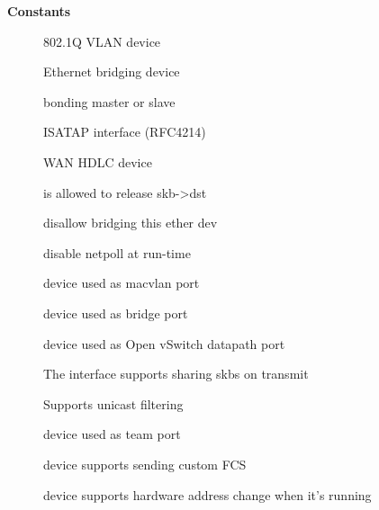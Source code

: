 \documentclass[a4paper,8pt,english]{sphinxmanual}
\begin{document}
\textbf{Constants}
\begin{description}
\item[{}] \leavevmode
802.1Q VLAN device

\item[{}] \leavevmode
Ethernet bridging device

\item[{}] \leavevmode
bonding master or slave

\item[{}] \leavevmode
ISATAP interface (RFC4214)

\item[{}] \leavevmode
WAN HDLC device

\item[{}] \leavevmode
{} is allowed to
release skb-\textgreater{}dst

\item[{}] \leavevmode
disallow bridging this ether dev

\item[{}] \leavevmode
disable netpoll at run-time

\item[{}] \leavevmode
device used as macvlan port

\item[{}] \leavevmode
device used as bridge port

\item[{}] \leavevmode
device used as Open vSwitch datapath port

\item[{}] \leavevmode
The interface supports sharing skbs on transmit

\item[{}] \leavevmode
Supports unicast filtering

\item[{}] \leavevmode
device used as team port

\item[{}] \leavevmode
device supports sending custom FCS

\item[{}] \leavevmode
device supports hardware address
change when it's running


\end{description}
\end{document}
